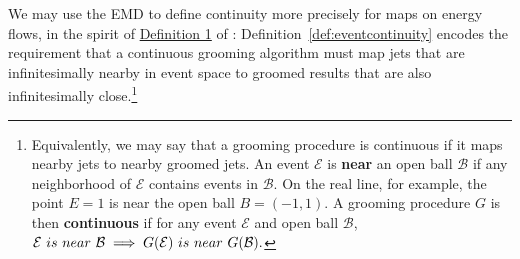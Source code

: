 We may use the EMD to define continuity more precisely for maps on energy flows, in the spirit of \href{https://arxiv.org/pdf/2004.04159.pdf#page=5\&zoom=100,0,350}{Definition 1} of :
%
%
\noindent Definition~\ref{def:eventcontinuity} encodes the requirement that a continuous grooming algorithm must map jets that are infinitesimally nearby in event space to groomed results that are also infinitesimally close.\footnote{
Equivalently, we may say that a grooming procedure is continuous if it maps nearby jets to nearby groomed jets.
%
An event \(\mathcal{E}\) is \textbf{near} an open ball \(\mathcal{B}\) if any neighborhood of \(\mathcal{E}\) contains events in \(\mathcal{B}\).
%
On the real line, for example, the point \(E = 1\) is near the open ball \(B = (-1, 1)\).
%
A grooming procedure \(G\) is then \textbf{continuous} if for any event \(\mathcal{E}\) and open ball \(\mathcal{B}\),
    \(
    \mathcal{E} {\text ~is~ near~} \mathcal{B}
    \implies
    G(\mathcal{E}) {\text~ is~ near~} G(\mathcal{B}).
    \)
}

